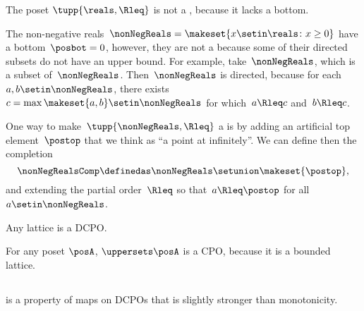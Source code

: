 \begin{example}
    \label{exa:Rcomp}
    The poset $\tupp{\reals, \Rleq}$ is not a \CPO, because it lacks a bottom.

    The non-negative reals~$\nonNegReals=\makeset{x\setin\reals \colon x\geq0}$ have a bottom~$\posbot=0$, however, they are not a \DCPO because some of their directed subsets do not have an upper bound.
    For example, take~$\nonNegReals$, which is a subset of~$\nonNegReals$.
    Then~$\nonNegReals$ is directed, because for each~$a,b\setin\nonNegReals$, there exists~$c=\max\makeset{a,b}\setin\nonNegReals$ for which~$a\Rleq c$ and~$b\Rleq c$.

    One way to make~$\tupp{ \nonNegReals,\Rleq} $ a \CPO is by adding an artificial top element~$\postop$ that we think as ``a point at infinitely''.
    We can define then the completion
    \begin{equation}
        \nonNegRealsComp\definedas\nonNegReals\setunion\makeset{\postop},
    \end{equation} and extending the partial order~$\Rleq$ so that~$a\Rleq\postop$ for all~$a\setin\nonNegReals$.
\end{example}

\begin{example}
    Any lattice is a DCPO.
\end{example}
\begin{example}
    For any poset $\posA$, $\uppersets \posA$ is a CPO, because it is a bounded lattice.
\end{example}
\subsection{\scottcontinuity}

\scottcontinuity is a property of maps on DCPOs that is slightly stronger than monotonicity.

